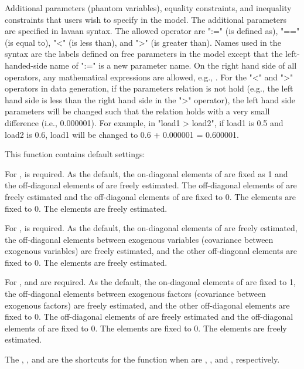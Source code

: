 \documentclass[a4paper]{book}
\begin{document}
\begin{Arguments}
\begin{ldescription}
\item[\code{con}] 
Additional parameters (phantom variables), equality constraints, and inequality constraints that users wish to specify in the model. The additional parameters are specified in lavaan syntax. The allowed operator are ":=" (is defined as), "==" (is equal to), "<" (is less than), and ">" (is greater than). Names used in the syntax are the labels defined on free parameters in the model except that the left-handed-side name of ":=" is a new parameter name. On the right hand side of all operators, any mathematical expressions are allowed, e.g., . For the "<" and ">" operators in data generation, if the parameters relation is not hold (e.g., the left hand side is less than the right hand side in the ">" operator), the left hand side parameters will be changed such that the relation holds with a very small difference (i.e., 0.000001). For example, in "load1 > load2", if load1 is 0.5 and load2 is 0.6, load1 will be changed to 0.6 + 0.000001 = 0.600001. 

\end{ldescription}
\end{Arguments}
%
\begin{Details}\relax
This function contains default settings:

For ,  is required. As the default, the on-diagonal elements of  are fixed as 1 and the off-diagonal elements of  are freely estimated. The off-diagonal elements of  are freely estimated and the off-diagonal elements of  are fixed to 0. The  elements are fixed to 0. The  elements are freely estimated.

For ,  is required. As the default, the on-diagonal elements of  are freely estimated, the off-diagonal elements between exogenous variables (covariance between exogenous variables) are freely estimated, and the other off-diagonal elements are fixed to 0. The  elements are freely estimated. 

For ,  and  are required. As the default, the on-diagonal elements of  are fixed to 1, the off-diagonal elements between exogenous factors (covariance between exogenous factors) are freely estimated, and the other off-diagonal elements are fixed to 0. The off-diagonal elements of  are freely estimated and the off-diagonal elements of  are fixed to 0. The  elements are fixed to 0. The  elements are freely estimated.

The , , and  are the shortcuts for the  function when  are , , and , respectively.
\end{Details}
\end{document}
